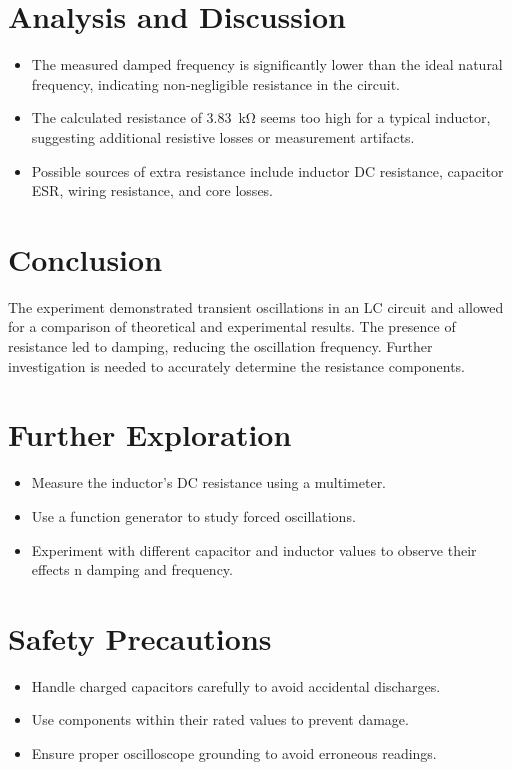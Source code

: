 \documentclass[a4paper,12pt]{article}
\begin{document}
\section{Analysis and Discussion}
\begin{itemize}
    \item The measured damped frequency is significantly lower than the ideal natural frequency, indicating non-negligible resistance in the circuit.
    \item The calculated resistance of \SI{3.83}{\kilo\ohm} seems too high for a typical inductor, suggesting additional resistive losses or measurement artifacts.
    \item Possible sources of extra resistance include inductor DC resistance, capacitor ESR, wiring resistance, and core losses.
\end{itemize}

\section{Conclusion}
The experiment demonstrated transient oscillations in an LC circuit and allowed for a comparison of theoretical and experimental results. The presence of resistance led to damping, reducing the oscillation frequency. Further investigation is needed to accurately determine the resistance components.

\section{Further Exploration}
\begin{itemize}
    \item Measure the inductor's DC resistance using a multimeter.
    \item Use a function generator to study forced oscillations.
    \item Experiment with different capacitor and inductor values to observe their effects n damping and frequency.
\end{itemize}

\section{Safety Precautions}
\begin{itemize}
    \item Handle charged capacitors carefully to avoid accidental discharges.
    \item Use components within their rated values to prevent damage.
    \item Ensure proper oscilloscope grounding to avoid erroneous readings.
\end{itemize}
\end{document}

